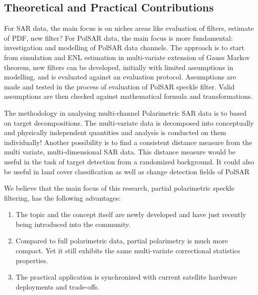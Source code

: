 
\subsection{Theoretical and Practical Contributions}

For SAR data, the main focus is on niches areas like evaluation of filters, estimate of PDF, new filter?
For PolSAR data, the main focus is more fundamental: investigation and modelling of PolSAR data channels. 
The approach is to start from simulation and ENL estimation in multi-variate extension of Gauss Markov theorem, 
new filters can be developed, initially with limited assumptions in modelling, and is evaluated against an evaluation protocol.
Assumptions are made and tested in the process of evaluation of PolSAR speckle filter. 
Valid assumptions are then checked against mathematical formula and transformations.

The methodology in analysing multi-channel Polarimetric SAR data is to based on target decompositions.
The multi-variate data is decomposed into conceptually and physically independent quantities and analysis is conducted on them individually!
Another possibility is to find a consistent distance measure from the multi variate, multi-dimensional SAR data.
This distance measure would be useful in the task of target detection from a randomized background.
It could also be useful in land cover classification as well as change detection fields of PolSAR

We believe that the main focus of this research, partial polarimetric speckle filtering, has the following advantages:
\begin{enumerate}
\item The topic and the concept itself are newly developed and have just recently being introduced into the community.
\item Compared to full polarimetric data, partial polarimetry is much more compact.
Yet it still exhibits the same multi-variate correctional statistics properties. 
\item The practical application is synchronized with current satellite hardware deployments and trade-offs.
\end{enumerate}

